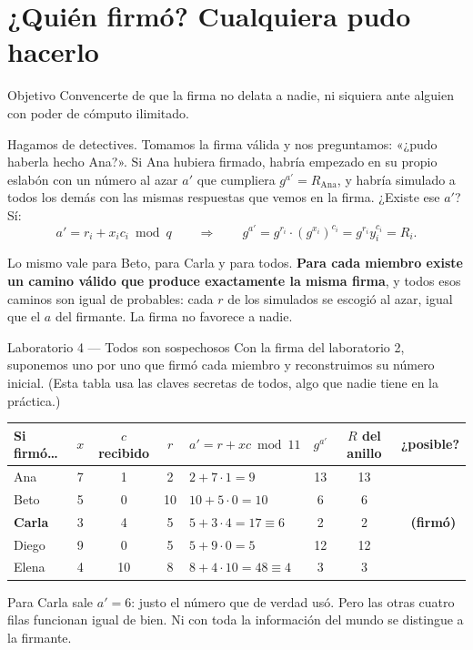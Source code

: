 \documentclass[11pt,a4paper]{article}
\theoremstyle{definition}
\theoremstyle{plain}
\theoremstyle{remark}
\newcommand{\si}{\textcolor{mintc}{\checkmark}}
\begin{document}
\section{¿Quién firmó? Cualquiera pudo hacerlo}\label{sec:quien}

\begin{nota}{Objetivo}
Convencerte de que la firma no delata a nadie, ni siquiera ante alguien con poder de
cómputo ilimitado.
\end{nota}

Hagamos de detectives. Tomamos la firma válida y nos preguntamos: «¿pudo haberla
hecho Ana?». Si Ana hubiera firmado, habría empezado en su propio eslabón con un
número al azar $a'$ que cumpliera $g^{a'} = R_{\text{Ana}}$, y habría simulado a
todos los demás con las mismas respuestas que vemos en la firma. ¿Existe ese $a'$?
Sí:
\begin{equation}\label{eq:detective}
  a' = r_i + x_i c_i \bmod q
  \qquad\Longrightarrow\qquad
  g^{a'} = g^{r_i}\cdot (g^{x_i})^{c_i} = g^{r_i} y_i^{c_i} = R_i .
\end{equation}

Lo mismo vale para Beto, para Carla y para todos. \textbf{Para cada miembro existe un
camino válido que produce exactamente la misma firma}, y todos esos caminos son
igual de probables: cada $r$ de los simulados se escogió al azar, igual que el $a$
del firmante. La firma no favorece a nadie.

\begin{laboratorio}{Laboratorio 4 — Todos son sospechosos}
Con la firma del laboratorio 2, suponemos uno por uno que firmó cada miembro y
reconstruimos su número inicial. (Esta tabla usa las claves secretas de todos, algo
que nadie tiene en la práctica.)

\begin{center}\small
\begin{tabular}{@{}l c c c l c c c@{}}
\toprule
\textbf{Si firmó…} & $x$ & $c$ recibido & $r$ & $a' = r + x c \bmod 11$ & $g^{a'}$ & $R$ del anillo & ¿posible? \\
\midrule
Ana   & 7 & 1  & 2  & $2 + 7\cdot 1 = 9$            & 13 & 13 & \si \\
Beto  & 5 & 0  & 10 & $10 + 5\cdot 0 = 10$          & 6  & 6  & \si \\
\textcolor{violetdeep}{\textbf{Carla}} & 3 & 4  & 5  & $5 + 3\cdot 4 = 17 \equiv 6$  & 2  & 2  & \si\ \textcolor{violetdeep}{\textbf{(firmó)}} \\
Diego & 9 & 0  & 5  & $5 + 9\cdot 0 = 5$            & 12 & 12 & \si \\
Elena & 4 & 10 & 8  & $8 + 4\cdot 10 = 48 \equiv 4$ & 3  & 3  & \si \\
\bottomrule
\end{tabular}
\end{center}

Para Carla sale $a' = 6$: justo el número que de verdad usó. Pero las otras cuatro
filas funcionan igual de bien. Ni con toda la información del mundo se distingue a la
firmante.
\end{laboratorio}
\end{document}
